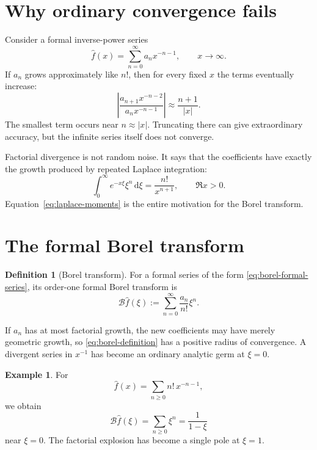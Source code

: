 \documentclass[11pt,openany]{book}
\theoremstyle{definition}
\newtheorem{definition}{Definition}[chapter]
\newtheorem{example}{Example}[chapter]
\theoremstyle{plain}
\theoremstyle{remark}
\newcommand{\dd}{\,\mathrm{d}}
\newcommand{\trans}[1]{\widehat{#1}}
\newcommand{\Borel}{\mathcal{B}}
\begin{document}
\section{Why ordinary convergence fails}

Consider a formal inverse-power series
\begin{equation}\label{eq:borel-formal-series}
 \trans f(x)=\sum_{n=0}^{\infty}a_nx^{-n-1},
 \qquad x\longrightarrow\infty.
\end{equation}
If $a_n$ grows approximately like $n!$, then for every fixed $x$ the terms eventually increase:
\[
 \left|\frac{a_{n+1}x^{-n-2}}{a_nx^{-n-1}}\right|
 \approx\frac{n+1}{|x|}.
\]
The smallest term occurs near $n\approx |x|$. Truncating there can give extraordinary accuracy, but the infinite series itself does not converge.

Factorial divergence is not random noise. It says that the coefficients have exactly the growth produced by repeated Laplace integration:
\begin{equation}\label{eq:laplace-moments}
 \int_0^{\infty}e^{-x\xi}\xi^n\dd\xi
 =\frac{n!}{x^{n+1}},
 \qquad \Re x>0.
\end{equation}
Equation~\eqref{eq:laplace-moments} is the entire motivation for the Borel transform.

\section{The formal Borel transform}

\begin{definition}[Borel transform]
For a formal series of the form \eqref{eq:borel-formal-series}, its order-one formal Borel transform is
\begin{equation}\label{eq:borel-definition}
 \Borel\trans f(\xi)
 :=\sum_{n=0}^{\infty}\frac{a_n}{n!}\xi^n.
\end{equation}
\end{definition}

If $a_n$ has at most factorial growth, the new coefficients may have merely geometric growth, so \eqref{eq:borel-definition} has a positive radius of convergence. A divergent series in $x^{-1}$ has become an ordinary analytic germ at $\xi=0$.

\begin{example}
For
\[
 \trans f(x)=\sum_{n\ge0}n!\,x^{-n-1},
\]
we obtain
\[
 \Borel\trans f(\xi)=\sum_{n\ge0}\xi^n=\frac1{1-\xi}
\]
near $\xi=0$. The factorial explosion has become a single pole at $\xi=1$.
\end{example}
\end{document}
